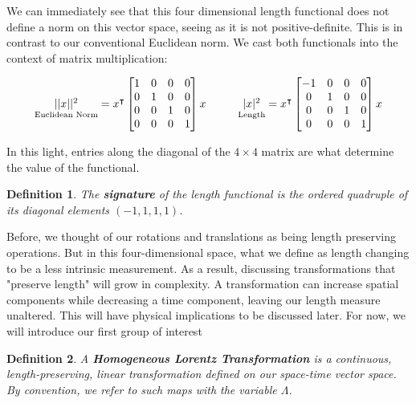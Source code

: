 \documentclass[10pt]{ucthesis}
\newtheorem{definition}{Definition}[chapter]
\begin{document}
We can immediately see that this four dimensional length functional does not define a norm on this vector space, seeing as it is not positive-definite. This is in contrast to our conventional Euclidean norm. We cast both functionals into the context of matrix multiplication:

$$\begin{array}{c@{\hskip 1cm}c}

	\underset{\text{Euclidean Norm}}{||x||^2} = x^\intercal\begin{bmatrix}
													1 & 0 & 0 & 0\\
													 0 & 1 & 0 & 0\\
													0 & 0 & 1 & 0\\
													0 & 0 & 0 & 1
												\end{bmatrix}x

&
	\underset{\text{Length}}{|x|^2} = x^\intercal\begin{bmatrix}
													-1 & 0 & 0 & 0\\
													 0 & 1 & 0 & 0\\
													0 & 0 & 1 & 0\\
													0 & 0 & 0 & 1
												\end{bmatrix}x

\end{array}$$

In this light, entries along the diagonal of the $4\times 4$ matrix are what determine the value of the functional.

\begin{definition}
	The \textbf{signature} of the length functional is the ordered quadruple of its diagonal elements $(-1,1,1,1)$.
\end{definition}

Before, we thought of our rotations and translations as being length preserving operations. But in this four-dimensional space, what we define as length changing to be a less intrinsic measurement. As a result, discussing transformations that "preserve length" will grow in complexity. A transformation can increase spatial components while decreasing a time component, leaving our length measure unaltered. This will have physical implications to be discussed later. For now, we will introduce our first group of interest

\begin{definition}
	A \textbf{Homogeneous Lorentz Transformation} is a continuous, length-preserving, linear transformation defined on our space-time vector space. By convention, we refer to such maps with the variable $\Lambda$.
\end{definition}
\end{document}

